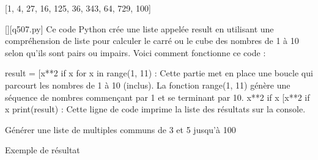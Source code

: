 [1, 4, 27, 16, 125, 36, 343, 64, 729, 100]
        \par
        \begin{solution}
            \renewcommand{\nomfichier}{q507.py}
            \pythonfile{\chemincode \nomfichier}[][\nomfichier]
            Ce code Python crée une liste appelée result en utilisant une compréhension de liste pour calculer le carré ou le cube des nombres de 1 à 10 selon qu'ils sont pairs ou impairs. Voici comment fonctionne ce code :

    result = [x**2 if x %
        for x in range(1, 11) : Cette partie met en place une boucle qui parcourt les nombres de 1 à 10 (inclus). La fonction range(1, 11) génère une séquence de nombres commençant par 1 et se terminant par 10.
        x**2 if x %
        [x**2 if x %
    print(result) : Cette ligne de code imprime la liste des résultats sur la console.
        \end{solution}
        

        \question
        Générer une liste de multiples communs de 3 et 5 jusqu'à 100

Exemple de résultat

